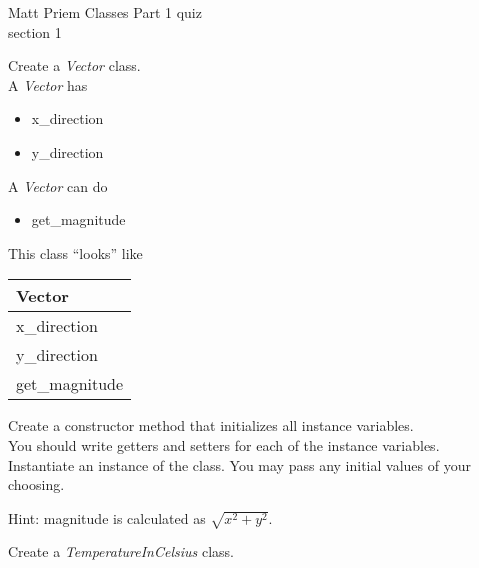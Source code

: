 \documentclass{article}
\begin{document}

Matt Priem \hfill Classes Part 1 quiz\\
section 1\\
\begin{enumerate}

	\begin{minipage}{.6\textwidth}
	\item Create a \textit{Vector} class.\\
		A \textit{Vector} has
		\begin{itemize}
			\item x\_direction 
			\item y\_direction
		\end{itemize}
		
		A \textit{Vector} can do
		\begin{itemize}
			\item get\_magnitude
		\end{itemize}
	\end{minipage}
	\begin{minipage}{.4\textwidth}
		This class ``looks'' like 
				
		\vspace*{1em}
		\begin{tabular}{|l|}
			\hline Vector\\ \hline
			x\_direction\\ y\_direction\\ \hline
			get\_magnitude\\  \hline
		\end{tabular}
	\end{minipage}

	\vspace*{2ex}
	Create a constructor method that initializes all instance variables.\\
	You should write getters and setters for each of the instance variables.\\
	Instantiate an instance of the class. You may pass any initial values of your choosing.
	
	Hint: magnitude is calculated as $\sqrt{x^2 + y^2}$.



	\begin{minipage}{.6\textwidth}
		\item Create a \textit{TemperatureInCelsius} class.\\
		

\end{minipage}
\end{enumerate}
\end{document}
